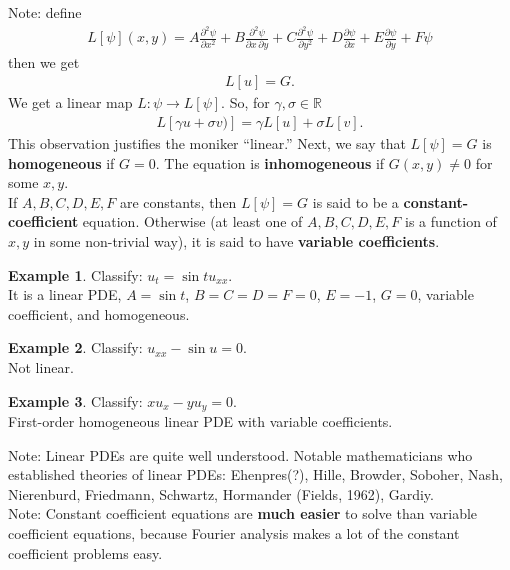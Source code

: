 \documentclass{article}
\theoremstyle{definition}
\newtheorem{exmp}{Example}[section]
\begin{document}

Note: define
\begin{align*}
L[\psi](x,y) = A\frac{\partial^2 \psi}{\partial x^2} + B\frac{\partial^2 \psi}{\partial x\,\partial y} + C\frac{\partial^2 \psi}{\partial y^2} + D\frac{\partial \psi}{\partial x} + E\frac{\partial \psi}{\partial y} + F\psi
\end{align*}
then we get
\begin{align*}
L[u] = G.
\end{align*}
We get a linear map $L:\psi\rightarrow L[\psi]$. So, for $\gamma, \sigma \in \mathbb{R}$
\begin{align*}
L[\gamma u+ \sigma v)] = \gamma L[u] + \sigma L[v].
\end{align*}
This observation justifies the moniker ``linear.'' Next, we say that $L[\psi] = G$ is \textbf{homogeneous} if $G = 0$. The equation is \textbf{inhomogeneous} if $G(x,y)\neq 0$ for some $x,y$.\\

If $A,B,C,D,E,F$ are constants, then $L[\psi] = G$ is said to be a \textbf{constant-coefficient} equation. Otherwise (at least one of $A,B,C,D,E,F$ is a function of $x,y$ in some non-trivial way), it is said to have \textbf{variable coefficients}. 

\begin{exmp}
	Classify: $u_t = \sin t u_{xx}$.\\
	
	It is a linear PDE, $A = \sin t$, $B=C=D=F=0$, $E=-1$, $G=0$, variable coefficient, and homogeneous. 
\end{exmp}
\begin{exmp}
	Classify: $u_{xx} -\sin u = 0$.\\
	
	Not linear.
\end{exmp}

\begin{exmp}
	Classify: $xu_x - yu_y = 0$.\\
	
	First-order homogeneous linear PDE with variable coefficients. 
\end{exmp}

Note: Linear PDEs are quite well understood. Notable mathematicians who established theories of linear PDEs: Ehenpres(?), Hille, Browder, Soboher, Nash, Nierenburd, Friedmann, Schwartz, Hormander (Fields, 1962), Gardiy.\\

Note: Constant coefficient equations are \textbf{much easier} to solve than variable coefficient equations, because Fourier analysis makes a lot of the constant coefficient problems easy.\\
\end{document}
